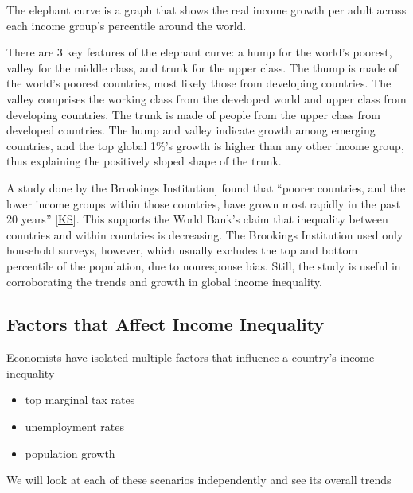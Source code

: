 \documentclass[letterpaper,10pt,english]{jupyterBook}
\begin{document}
\sphinxAtStartPar
The elephant curve is a graph that shows the real income growth per adult across each income group’s percentile around the world.

\sphinxAtStartPar
There are 3 key features of the elephant curve: a hump for the world’s poorest, valley for the middle class, and trunk for the upper class. The thump is made of the world’s poorest countries, most likely those from developing countries. The valley comprises the working class from the developed world and upper class from developing countries. The trunk is made of people from the upper class from developed countries. The hump and valley indicate growth among emerging countries, and the top global 1\%’s growth is higher than any other income group, thus explaining the positively sloped shape of the trunk.

\sphinxAtStartPar
A study done by the Brookings Institution{]} found that “poorer countries, and the lower income groups within those countries, have grown most rapidly in the past 20 years” {[}\hyperlink{cite.content/references:id4}{KS}{]}. This supports the World Bank’s claim that inequality between countries and within countries is decreasing. The Brookings Institution used only household surveys, however, which usually excludes the top and bottom percentile of the population, due to non\sphinxhyphen{}response bias. Still, the study is useful in corroborating the trends and growth in global income inequality.


\subsection{Factors that Affect Income Inequality}
\label{\detokenize{content/06-inequality/historical-inequality:factors-that-affect-income-inequality}}
\sphinxAtStartPar
Economists have isolated multiple factors that influence a country’s income inequality
\begin{itemize}
\item {} 
\sphinxAtStartPar
top marginal tax rates

\item {} 
\sphinxAtStartPar
unemployment rates

\item {} 
\sphinxAtStartPar
population growth

\end{itemize}

\sphinxAtStartPar
We will look at each of these scenarios independently and see its overall trends
\end{document}
